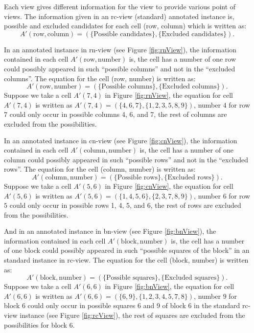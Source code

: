 \documentclass[11pt]{report}
\newcommand{\set}[1]{\{ #1 \}}
\begin{document}
Each view gives different information for the view to provide various point of views. The information given in an rc-view (standard) annotated instance is, possible and excluded candidates for each cell (row, column) which is written as:
\begin{displaymath}
  A'(\text{row},\text{column}) = (\set{\text{Possible candidates}}, \set{\text{Excluded candidates}}).
\end{displaymath}


In an annotated instance in rn-view (see Figure \ref{fig:rnView}), the information contained in each cell $A'(\text{row},\text{number})$ is, the cell has a number of one row could possibly appeared in such ``possible columns'' and not in the ``excluded columns''. The equation for the cell (row, number) is written as:
\begin{displaymath}
A'(\text{row},\text{number}) =(\set{\text{Possible columns}}, \set{\text{Excluded columns}}).
\end{displaymath}
Suppose we take a cell $A'(7,4)$ in Figure \ref{fig:rnView}, the equation for cell $A'(7,4)$ is written as $A'(7,4) =(\set{4, 6, 7}, \set{1, 2, 3, 5, 8, 9} )$, number $4$ for row $7$ could only occur in possible columns 4, 6, and 7, the rest of columns are excluded from the possibilities.


In an annotated instance in cn-view (see Figure \ref{fig:cnView}), the information contained in each cell $A'(\text{column},\text{number})$ is, the cell has a number of one column could possibly appeared in such ``possible rows'' and not in the ``excluded rows''. The equation for the cell (column, number) is written as:
\begin{displaymath}
A'(\text{column},\text{number}) =(\set{\text{Possible rows}}, \set{\text{Excluded rows}}).
\end{displaymath}
Suppose we take a cell $A'(5,6)$ in Figure \ref{fig:cnView}, the equation for cell $A'(5,6)$ is written as $A'(5,6) =(\set{1, 4, 5, 6}, \set{2, 3, 7, 8, 9} )$, number $6$ for row $5$ could only occur in possible rows 1, 4, 5, and 6, the rest of rows are excluded from the possibilities.

And in an annotated instance in bn-view (see Figure \ref{fig:bnView}), the information contained in each cell $A'(\text{block},\text{number})$ is, the cell has a number of one block could possibly appeared in such ``possible squares of the block'' in an standard instance in rc-view. The equation for the cell (block, number) is written as:
\begin{displaymath}
A'(\text{block},\text{number}) =(\set{\text{Possible squares}}, \set{\text{Excluded squares}}).
\end{displaymath}
Suppose we take a cell $A'(6,6)$ in Figure \ref{fig:bnView}, the equation for cell $A'(6,6)$ is written as $A'(6,6) =(\set{6, 9}, \set{1, 2, 3, 4, 5, 7, 8} )$, number $9$ for block $6$ could only occur in possible squares 6 and 9 of block $6$ in the standard rc-view instance (see Figure \ref{fig:rcView}), the rest of squares are excluded from the possibilities for block $6$.
\end{document}
